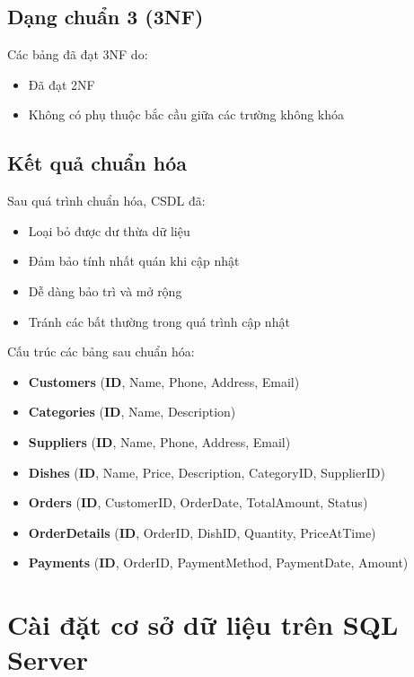 \documentclass{article}
\begin{document}
\subsection{Dạng chuẩn 3 (3NF)}

Các bảng đã đạt 3NF do:

\begin{itemize}
    \item Đã đạt 2NF
    \item Không có phụ thuộc bắc cầu giữa các trường không khóa
\end{itemize}

\subsection{Kết quả chuẩn hóa}

Sau quá trình chuẩn hóa, CSDL đã:

\begin{itemize}
    \item Loại bỏ được dư thừa dữ liệu
    \item Đảm bảo tính nhất quán khi cập nhật
    \item Dễ dàng bảo trì và mở rộng
    \item Tránh các bất thường trong quá trình cập nhật
\end{itemize}

Cấu trúc các bảng sau chuẩn hóa:

\begin{itemize}
    \item \textbf{Customers} (\textbf{ID}, Name, Phone, Address, Email)
    \item \textbf{Categories} (\textbf{ID}, Name, Description)
    \item \textbf{Suppliers} (\textbf{ID}, Name, Phone, Address, Email)
    \item \textbf{Dishes} (\textbf{ID}, Name, Price, Description, CategoryID, SupplierID)
    \item \textbf{Orders} (\textbf{ID}, CustomerID, OrderDate, TotalAmount, Status)
    \item \textbf{OrderDetails} (\textbf{ID}, OrderID, DishID, Quantity, PriceAtTime)
    \item \textbf{Payments} (\textbf{ID}, OrderID, PaymentMethod, PaymentDate, Amount)
\end{itemize}

\section{Cài đặt cơ sở dữ liệu trên SQL Server}
\end{document}
